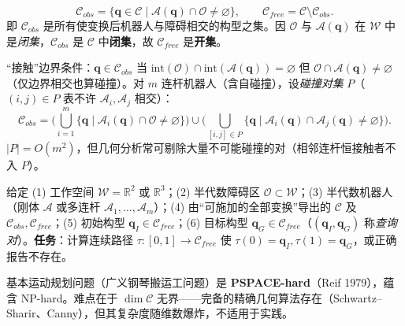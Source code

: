 \begin{definition}[C-空间障碍区与自由空间]\label{def:plan-cobs}
\begin{equation}
  \mathcal{C}_{obs}=\{\mathbf{q}\in\mathcal{C}\mid\mathcal{A}(\mathbf{q})\cap\mathcal{O}\ne\varnothing\},\qquad
  \mathcal{C}_{free}=\mathcal{C}\setminus\mathcal{C}_{obs}.
  \label{eq:plan-cobsfree}
\end{equation}
即 $\mathcal{C}_{obs}$ 是所有使变换后机器人与障碍相交的构型之集。因 $\mathcal{O}$ 与 $\mathcal{A}(\mathbf{q})$ 在 $\mathcal{W}$ 中是\emph{闭集}，$\mathcal{C}_{obs}$ 是 $\mathcal{C}$ 中\textbf{闭集}，故 $\mathcal{C}_{free}$ 是\textbf{开集}。
\end{definition}

\noindent “接触”边界条件：$\mathbf{q}\in\mathcal{C}_{obs}$ 当 $\mathrm{int}(\mathcal{O})\cap\mathrm{int}(\mathcal{A}(\mathbf{q}))=\varnothing$ 但 $\mathcal{O}\cap\mathcal{A}(\mathbf{q})\ne\varnothing$（仅边界相交也算碰撞）。对 $m$ 连杆机器人（含自碰撞），设\emph{碰撞对集} $P$（$(i,j)\in P$ 表不许 $\mathcal{A}_i,\mathcal{A}_j$ 相交）：
\begin{equation}
  \mathcal{C}_{obs}=\Big(\bigcup_{i=1}^m\{\mathbf{q}\mid\mathcal{A}_i(\mathbf{q})\cap\mathcal{O}\ne\varnothing\}\Big)\cup\Big(\bigcup_{[i,j]\in P}\{\mathbf{q}\mid\mathcal{A}_i(\mathbf{q})\cap\mathcal{A}_j(\mathbf{q})\ne\varnothing\}\Big).
  \label{eq:plan-cobs-multi}
\end{equation}
$|P|=O(m^2)$，但几何分析常可剔除大量不可能碰撞的对（相邻连杆恒接触者不入 $P$）。

\begin{definition}\label{def:plan-piano}
给定 (1) 工作空间 $\mathcal{W}=\mathbb{R}^2$ 或 $\mathbb{R}^3$；(2) 半代数障碍区 $\mathcal{O}\subset\mathcal{W}$；(3) 半代数机器人（刚体 $\mathcal{A}$ 或多连杆 $\mathcal{A}_1,\dots,\mathcal{A}_m$）；(4) 由“可施加的全部变换”导出的 $\mathcal{C}$ 及 $\mathcal{C}_{obs},\mathcal{C}_{free}$；(5) 初始构型 $\mathbf{q}_I\in\mathcal{C}_{free}$；(6) 目标构型 $\mathbf{q}_G\in\mathcal{C}_{free}$（$(\mathbf{q}_I,\mathbf{q}_G)$ 称\emph{查询对}）。\textbf{任务}：计算连续路径 $\tau:[0,1]\to\mathcal{C}_{free}$ 使 $\tau(0)=\mathbf{q}_I,\tau(1)=\mathbf{q}_G$，或正确报告不存在。
\end{definition}

\begin{theorem}\label{thm:plan-pspace}
基本运动规划问题（广义钢琴搬运工问题）是 \textbf{PSPACE-hard}（Reif 1979\cite{lavalle2006planning}），蕴含 NP-hard。难点在于 $\dim\mathcal{C}$ 无界——完备的精确几何算法存在（Schwartz--Sharir、Canny），但其复杂度随维数爆炸，不适用于实践。
\end{theorem}

